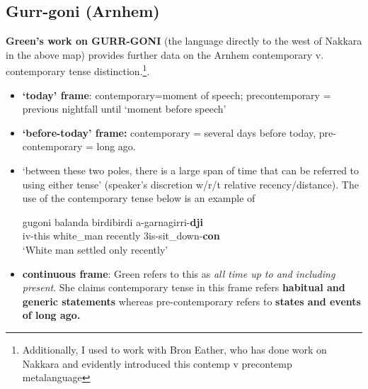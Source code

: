 \documentclass[11pt]{article}
\begin{document}
\subsection*{Gurr-goni (Arnhem)}
\textbf{Green's work on GURR-GONI }(the language directly to the west of Nakkara in the above map) provides further data on the Arnhem contemporary v. contemporary tense distinction.\footnote{Additionally, I used to work with Bron Eather, who has done work on Nakkara and evidently introduced this contemp v precontemp metalanguage}.
\begin{itemize}
\item \textbf{`today' frame}: contemporary=moment of speech; precontemporary = previous nightfall until `moment before speech'
\item \textbf{`before-today' frame:} contemporary =  several days before today, pre-contemporary = long ago.
\item `between these two poles, there is a large span of time that can be referred to using either tense' (speaker's discretion w/r/t relative recency/distance). The use of the contemporary tense below is an example of
\begin{exe}
\ex\gll gugoni balanda birdibirdi a-garnagirri-\textbf{dji}\\
{\sc iv}-this white\_man recently 3{\sc is}-sit\_down-{\sc \textbf{con}}\\
\glt`White man settled only recently'
\end{exe}
\item \textbf{continuous frame}: Green refers to this as \textit{all time up to and including present}. She claims contemporary tense in this frame refers \textbf{habitual and generic statements} whereas pre-contemporary refers to \textbf{states and events of long ago.}
\end{itemize}
\end{document}
